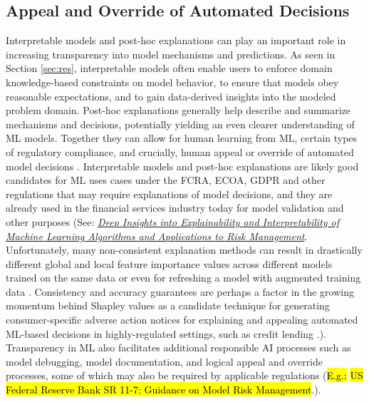 \documentclass[information,article,accept,moreauthors,pdftex]{Definitions/mdpi}
\begin{document}
{{{\subsection{Appeal and Override of Automated Decisions}

Interpretable models and post-hoc explanations can play an important role in increasing transparency into model mechanisms and predictions. As seen in Section \ref{sec:res}, interpretable models often enable users to enforce domain knowledge-based constraints on model behavior, to ensure that models obey reasonable expectations, and to gain data-derived insights into the modeled problem domain. Post-hoc explanations generally help describe and summarize mechanisms and decisions, potentially yielding an even clearer understanding of ML models. Together they can allow for human learning from ML, certain types of regulatory compliance, and crucially, human appeal or override of automated model decisions \cite{art_and_sci}. Interpretable models and post-hoc explanations are likely good candidates for ML uses cases under the FCRA, ECOA, GDPR and other regulations that may require explanations of model decisions, and they are already used in the financial services industry today for model validation and other purposes (See: 
\href{https://ww2.amstat.org/meetings/jsm/2019/onlineprogram/AbstractDetails.cfm?abstractid=303053}
{\textit{Deep Insights into Explainability and Interpretability of Machine Learning Algorithms and Applications to Risk Management}}.  {Unfortunately, many non-consistent explanation methods can result in drastically different global and local feature importance values across different models trained on the same data or even for refreshing a model with augmented training data \cite{molnar}. Consistency and accuracy guarantees are perhaps a factor in the growing momentum behind Shapley values as a candidate technique for generating consumer-specific adverse action notices for explaining and appealing automated ML-based decisions in highly-regulated settings, such as credit lending \cite{bracke2019machine}.}). Transparency in ML also facilitates additional responsible AI processes such as model debugging, model documentation, and logical appeal and override processes, some of which may also be required by applicable regulations ({\hl{E.g.:}  %
{\hl{US Federal Reserve Bank SR 11-7: Guidance on Model Risk Management}}.}).%
}}}
\end{document}
